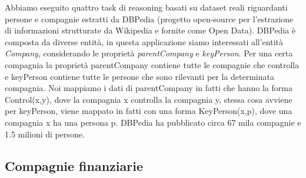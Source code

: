 Abbiamo eseguito quattro task di reasoning basati su dataset reali riguardanti persone e compagnie estratti da DBPedia (progetto open-source per l'estrazione di informazioni strutturate da Wikipedia e fornite come Open Data). \newline
DBPedia è composta da diverse entità, in questa applicazione siamo interessati all'entità \emph{Company}, considerando le proprietà \emph{parentCompany} e \emph{keyPerson}. Per una certa compagnia la proprietà parentCompany contiene tutte le compagnie che controlla e keyPerson contiene tutte le persone che sono rilevanti per la determinata compagnia. \newline
Noi mappiamo i dati di parentCompany in fatti che hanno la forma Control(x,y), dove la compagnia x controlla la compagnia y, stessa cosa avviene per keyPerson, viene mappato in fatti con una forma KeyPerson(x,p), dove una compagnia x ha una persona p. DBPedia ha pubblicato circa 67 mila compagnie e 1.5 milioni di persone. \newline


\subsection{Compagnie finanziarie}

